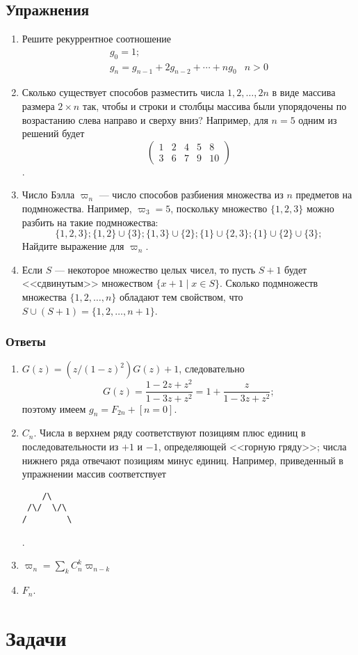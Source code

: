 \documentclass[14pt,openany]{book}
\begin{document}
\chapter{Упражнения}
\begin{enumerate}

\item Решите рекуррентное соотношение
$$
\begin{array}{ll}
g_0 = 1; \\
g_n = g_{n-1} + 2g_{n-2} + \cdots + ng_0 & n>0
\end{array}
$$

\item Сколько существует способов разместить числа ${1, 2, \ldots , 2n}$ 
в виде массива размера $2 \times n$ так, чтобы и строки и столбцы массива
были упорядочены по возрастанию слева направо и сверху вниз?
Например, для $n=5$ одним из решений будет 
$$\begin{pmatrix}
1 & 2 & 4 & 5 & 8 \\
3 & 6 & 7 & 9 & 10 
\end{pmatrix}$$.

\item Число Бэлла $\varpi_n$ --- число способов разбиения множества из $n$ предметов на подмножества.
      Например, $\varpi_3=5$, поскольку множество $\{1,2,3\}$ можно разбить на такие подмножества:
      $$\{1,2,3\}; \{1,2\}\cup\{3\}; \{1,3\}\cup\{2\}; \{1\}\cup\{2,3\}; \{1\}\cup\{2\}\cup\{3\}; $$
      Найдите выражение для $\varpi_n$.

\item Если $S$ --- некоторое множество целых чисел, то пусть $S+1$ будет <<сдвинутым>>
множеством $\{x+1 \mid x \in S\}$. Сколько подмножеств множества $\{1,2,\ldots,n\}$ обладают
тем свойством, что $S\cup(S+1) = \{1,2,\ldots,n+1\}$.

\end{enumerate}

\section{Ответы}
\begin{enumerate}

\item $G(z)=(z/(1-z)^2)G(z)+1$, следовательно 
$$G(z) = \frac{1-2z+z^2}{1-3z+z^2} = 1 + \frac{z}{1-3z+z^2};$$
поэтому имеем $g_n=F_{2n}+[n=0]$.

\item $C_n$. Числа в верхнем ряду соответствуют позициям плюс единиц в последовательности
из $+1$ и $-1$, определяющей <<горную гряду>>; числа нижнего ряда отвечают позициям
минус единиц. Например, приведенный в упражнении массив соответствует
\begin{verbatim}
    /\     
 /\/  \/\  
/        \ 
\end{verbatim}.

\item $\varpi_n = \sum_k C_n^k\varpi_{n-k}$

\item $F_n$.

\end{enumerate}

\part{Задачи}
\end{document}
